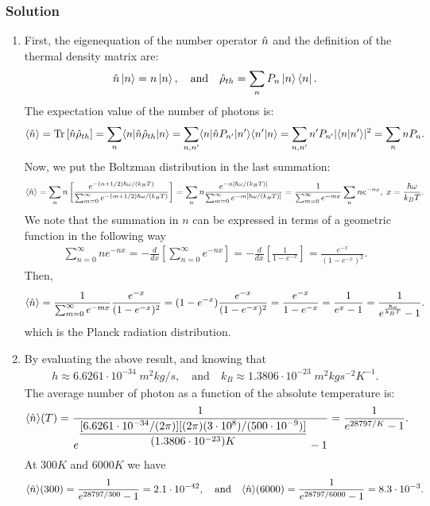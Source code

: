 \begin{example}{}
    \subsubsection{Solution}
  \begin{enumerate}[itemsep=0pt,topsep=0pt,parsep=0pt,label=\alph*)]
  \item First, the eigenequation of the number operator $\hat{n}$ and the definition of the thermal density matrix are:
  \begin{align*}
    \hat{n}\left|n\right\rangle=n\left|n\right\rangle,\quad\text{and}\quad\hat{\rho}_{th}=\sum_nP_n\left|n\right\rangle\left\langle n\right|.
  \end{align*}
  The expectation value of the number of photons is:
  \begin{align*}
    \langle\hat{n}\rangle=\text{Tr}\left[\hat{n}\hat{\rho}_{th}\right]=\sum_n \langle n|\hat{n}\hat{\rho}_{th}|n\rangle=\sum_{n,n'}\langle n|\hat{n} P_{n'}|n'\rangle\langle n'|n\rangle=\sum_{n,n'}n'P_{n'}|\langle n|n'\rangle|^2=\sum_nnP_n.
  \end{align*}
  Now, we put the Boltzman distribution in the last summation:
  \begin{align*}
    \langle\hat{n}\rangle=\sum_nn\left[\frac{e^{-(n+1/2)\hbar\omega/(k_BT)}}{\sum_{m=0}^\infty e^{-(m+1/2)\hbar\omega/(k_BT)}}\right]=\sum_nn\frac{e^{-n[\hbar\omega/(k_BT)]}}{\sum_{m=0}^\infty e^{-m[\hbar\omega/(k_BT)]}}=\frac{1}{\sum_{m=0}^\infty e^{-mx}}\sum_nne^{-nx},\;x=\frac{\hbar\omega}{k_BT}.
  \end{align*}
  We note that the summation in $n$ can be expressed in terms of a geometric function in the following way
  \begin{align*}
    \sum_{n=0}^\infty ne^{-nx}=-\frac{d}{dx}\left[\sum_{n=0}^\infty e^{-nx}\right]=-\frac{d}{dx}\left[\frac{1}{1-e^{-x}}\right]=\frac{e^{-x}}{(1-e^{-x})^2}.
  \end{align*}
  Then,
  \begin{align*}
    \langle\hat{n}\rangle=\frac{1}{\sum_{m=0}^\infty e^{-mx}}\frac{e^{-x}}{(1-e^{-x})^2}=(1-e^{-x})\frac{e^{-x}}{(1-e^{-x})^2}=\frac{e^{-x}}{1-e^{-x}}=\frac{1}{e^{x}-1}=\frac{1}{e^{\frac{\hbar\omega}{k_BT}}-1}.
  \end{align*}
  which is the Planck radiation distribution.
  \item By evaluating the above result, and knowing that 
  \begin{align*}
    h\approx6.6261\cdot10^{-34}\;m^2kg/s,\quad\text{and}\quad k_B\approx1.3806\cdot10^{-23}\;m^2kgs^{-2}K^{-1}.
  \end{align*}
  The average number of photon as a function of the absolute temperature is:
  \begin{align*}
    \langle\hat{n}\rangle(T)=\frac{1}{e^{\dfrac{[6.6261\cdot10^{-34}/(2\pi)][(2\pi)(3\cdot10^8)/(500\cdot10^{-9})]}{(1.3806\cdot10^{-23})K}}-1}=\frac{1}{e^{28797/K}-1}.
  \end{align*}
  At $300K$ and $6000K$ we have 
  \begin{align*}
    \langle\hat{n}\rangle(300)=\frac{1}{e^{28797/300}-1}=2.1\cdot10^{-42},\quad\text{and}\quad\langle\hat{n}\rangle(6000)=\frac{1}{e^{28797/6000}-1}=8.3\cdot10^{-3}.
  \end{align*}
\end{enumerate}
\end{example}


